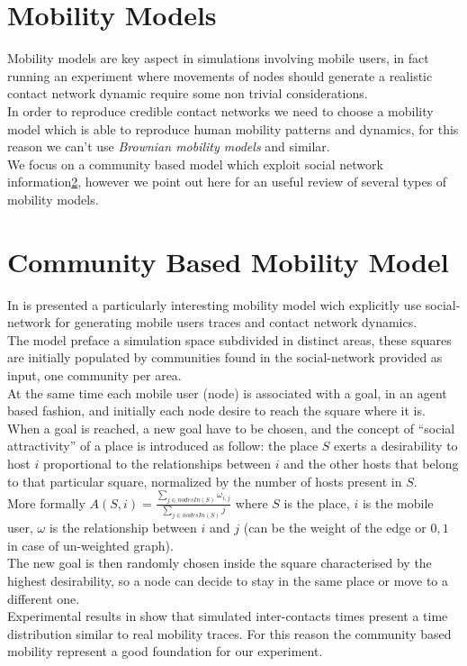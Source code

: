 \section{Mobility Models}
\label{mobility_models}

Mobility models are key aspect in simulations involving mobile users, in fact running an experiment where movements of nodes should generate a realistic contact network dynamic require some non trivial considerations.\\
In order to reproduce credible contact networks we need to choose a mobility model which is able to reproduce human mobility patterns and dynamics, for this reason we can't use \emph{Brownian mobility models} and similar.\\
We focus on a community based model which exploit social network information\ref{mobility_community_based_model}, however we point out here\cite{Camp02asurvey} for an useful review of several types of mobility models.

\section{Community Based Mobility Model}
\label{mobility_community_based_model}

In\cite{Musolesi:2006:CBM:1132983.1132990} is presented a particularly interesting mobility model wich explicitly use social-network for generating mobile users traces and contact network dynamics. \\
The model preface a simulation space subdivided in distinct areas, these squares are initially populated by communities found in the social-network provided as input, one community per area.\\
At the same time each mobile user (node) is associated with a goal, in an agent based fashion, and initially each node desire to reach the square where it is.\\
When a goal is reached, a new goal have to be chosen, and the concept of ``social attractivity'' of a place is introduced as follow: the place $S$ exerts a desirability to host $i$ proportional to the relationships between $i$ and the other hosts that belong to that particular square, normalized by the number of hosts present in $S$. \\
More formally $ A(S,i) = \frac{ \sum_{j \in nodesIn(S)}{ \omega_{i,j}}  }{ \sum_{j \in nodesIn(S)}{j}  } $ where $S$ is the place, $i$ is the mobile user, $\omega$ is the relationship between $i$ and $j$ (can be the weight of the edge or ${0,1}$ in case of un-weighted graph).\\
The new goal is then randomly chosen inside the square characterised by the highest desirability, so a node can decide to stay in the same place or move to a different one.\\
Experimental results in \cite{Musolesi:2006:CBM:1132983.1132990} show that simulated inter-contacts times present a time distribution similar to real mobility traces. For this reason the community based mobility represent a good foundation for our experiment.
